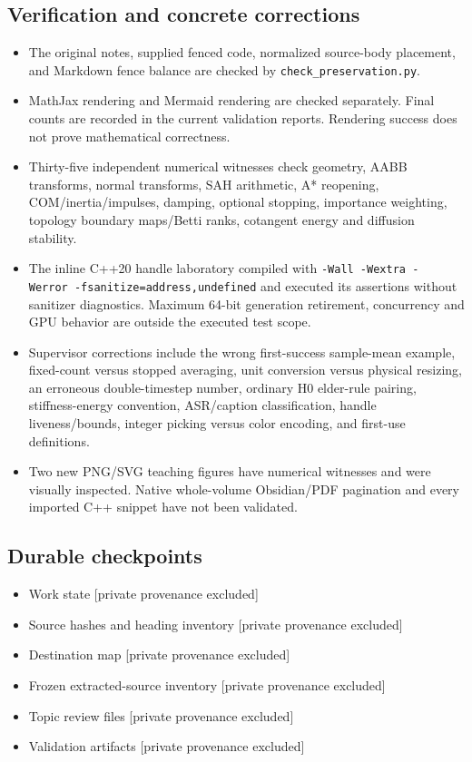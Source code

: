 \subsection{Verification and concrete corrections}\label{appendix-3b67654799a2-verification-and-concrete-corrections}

\begin{itemize}
\tightlist
\item
  The original notes, supplied fenced code, normalized source-body placement, and Markdown fence balance are checked by \texttt{check\_preservation.py}.
\item
  MathJax rendering and Mermaid rendering are checked separately. Final counts are recorded in the current validation reports. Rendering success does not prove mathematical correctness.
\item
  Thirty-five independent numerical witnesses check geometry, AABB transforms, normal transforms, SAH arithmetic, A* reopening, COM/inertia/impulses, damping, optional stopping, importance weighting, topology boundary maps/Betti ranks, cotangent energy and diffusion stability.
\item
  The inline C++20 handle laboratory compiled with \texttt{-Wall\ -Wextra\ -Werror\ -fsanitize=address,undefined} and executed its assertions without sanitizer diagnostics. Maximum 64-bit generation retirement, concurrency and GPU behavior are outside the executed test scope.
\item
  Supervisor corrections include the wrong first-success sample-mean example, fixed-count versus stopped averaging, unit conversion versus physical resizing, an erroneous double-timestep number, ordinary H0 elder-rule pairing, stiffness-energy convention, ASR/caption classification, handle liveness/bounds, integer picking versus color encoding, and first-use definitions.
\item
  Two new PNG/SVG teaching figures have numerical witnesses and were visually inspected. Native whole-volume Obsidian/PDF pagination and every imported C++ snippet have not been validated.
\end{itemize}

\subsection{Durable checkpoints}\label{appendix-3b67654799a2-durable-checkpoints}

\begin{itemize}
\tightlist
\item
  {Work state {[}private provenance excluded{]}}
\item
  {Source hashes and heading inventory {[}private provenance excluded{]}}
\item
  {Destination map {[}private provenance excluded{]}}
\item
  {Frozen extracted-source inventory {[}private provenance excluded{]}}
\item
  {Topic review files {[}private provenance excluded{]}}
\item
  {Validation artifacts {[}private provenance excluded{]}}
\end{itemize}


